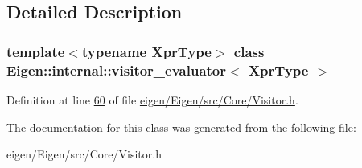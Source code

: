 \subsection{Detailed Description}
\subsubsection*{template$<$typename Xpr\+Type$>$\newline
class Eigen\+::internal\+::visitor\+\_\+evaluator$<$ Xpr\+Type $>$}



Definition at line \hyperlink{eigen_2_eigen_2src_2_core_2_visitor_8h_source_l00060}{60} of file \hyperlink{eigen_2_eigen_2src_2_core_2_visitor_8h_source}{eigen/\+Eigen/src/\+Core/\+Visitor.\+h}.



The documentation for this class was generated from the following file\+:\begin{DoxyCompactItemize}
\item 
eigen/\+Eigen/src/\+Core/\+Visitor.\+h\end{DoxyCompactItemize}
